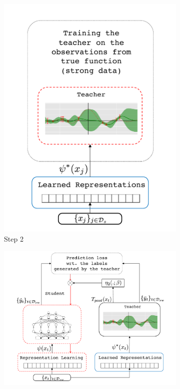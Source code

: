 \begin{figure}[!htbp]
\begin{subfigure}[t]{0.462\textwidth}
        \includegraphics[width=\textwidth]{03-part-02/chapter-05/figs_and_tables/fig_fwl_step_2.pdf}
        \caption{\label{fig:step2}Step 2}
    \end{subfigure}%
    \vfill
    \vspace{30pt}
    \begin{subfigure}[t]{0.7854\textwidth}
        \centering
        \includegraphics[width=\textwidth]{03-part-02/chapter-05/figs_and_tables/fig_fwl_step_3.pdf}

\end{subfigure}
\end{figure}
